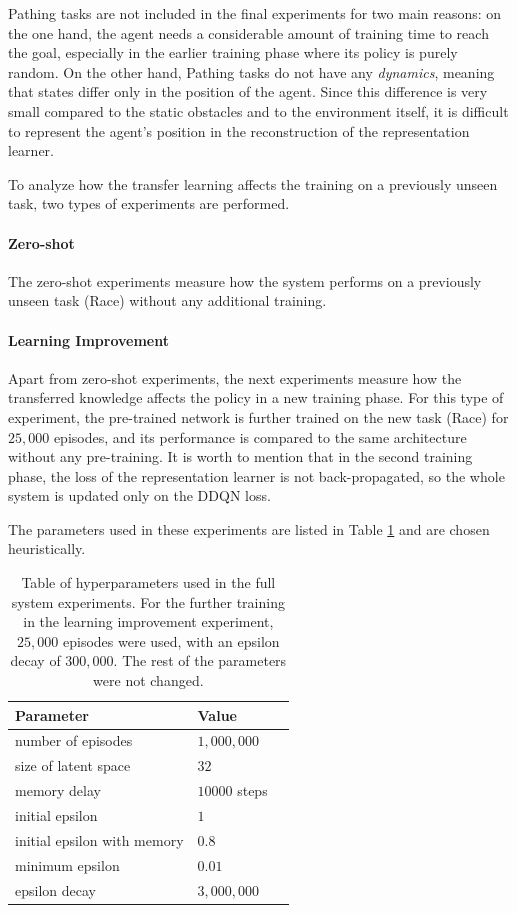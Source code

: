 Pathing tasks are not included in the final experiments for two main reasons: on the one hand, the agent needs a considerable amount of training time to reach the goal, especially in the earlier training phase where its policy is purely random. On the other hand, Pathing tasks do not have any \textit{dynamics}, meaning that states differ only in the position of the agent. Since this difference is very small compared to the static obstacles and to the environment itself, it is difficult to represent the agent's position in the reconstruction of the representation learner.

To analyze how the transfer learning affects the training on a previously unseen task, two types of experiments are performed.

\paragraph{Zero-shot} The zero-shot experiments measure how the system performs on a previously unseen task (Race) without any additional training. 

\paragraph{Learning Improvement} Apart from zero-shot experiments, the next experiments measure how the transferred knowledge affects the policy in a new training phase. 
For this type of experiment, the pre-trained network is further trained on the new task (Race) for $25,000$ episodes, and its performance is compared to the same architecture without any pre-training. It is worth to mention that in the second training phase, the loss of the representation learner is not back-propagated, so the whole system is updated only on the DDQN loss.

The parameters used in these experiments are listed in Table \ref{tab:hyperparas} and are chosen heuristically.

\begin{table}[t]
\centering
\begin{tabular}{@{}lll@{}}
\toprule
\textbf{Parameter} & \textbf{Value} \\ \midrule
number of episodes & $1,000,000$  \\
size of latent space & $32$  \\
memory delay & $10000$ steps  \\
initial epsilon & $1$  \\
initial epsilon with memory & $0.8$  \\
minimum epsilon & $0.01$  \\
epsilon decay & $3,000,000$  \\ \bottomrule
\end{tabular}
\caption{Table of hyperparameters used in the full system experiments. For the further training in the learning improvement experiment, $25,000$ episodes were used, with an epsilon decay of $300,000$. The rest of the parameters were not changed.\label{tab:hyperparas}}
\end{table}
